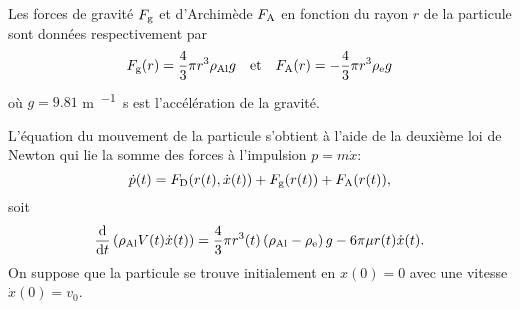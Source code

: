 Les forces de gravité $F_{\mathrm g}$ et d'Archimède $F_{\mathrm A}$
en fonction du rayon $r$ de la particule sont données respectivement
par
\begin{equation*}
F_{\mathrm g}(r) = \frac{4}{3}\pi r^3 \rho_\mathrm{Al} g
\quad\text{et}\quad
F_{\mathrm A}(r) = -\frac{4}{3}\pi r^3 \rho_\mathrm{e} g
\end{equation*}
où $g = 9.81$ \si{\meter\per\squared\second} est l'accélération de la gravité.

L'équation du mouvement de la particule s'obtient à l'aide de la
deuxième loi de Newton qui lie la somme des forces à l'impulsion $p =
m\dot x$:
\begin{equation*}
\dot p(t) = F_{\mathrm D}(r(t), \dot x(t)) + F_{\mathrm g}(r(t)) + F_{\mathrm A}(r(t)),
\end{equation*}
soit
\begin{equation}\label{eq:mvt}
  \frac{\mathrm d}{\mathrm dt}\left( \rho_\mathrm{Al} V(t)\dot x(t) \right) =
  \frac{4}{3}\pi r^3(t)\left( \rho_\mathrm{Al} - \rho_\mathrm{e} \right)g -
  6\pi\mu r(t)\dot x(t).
\end{equation}
On suppose que la particule se trouve initialement en $x(0) = 0$ avec
une vitesse $\dot x(0) = v_0$.

